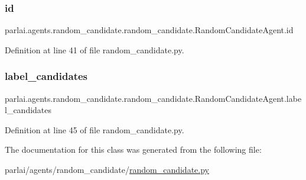 \subsubsection{\texorpdfstring{id}{id}}
{\footnotesize\ttfamily parlai.\+agents.\+random\+\_\+candidate.\+random\+\_\+candidate.\+Random\+Candidate\+Agent.\+id}



Definition at line 41 of file random\+\_\+candidate.\+py.

\mbox{\label{classparlai_1_1agents_1_1random__candidate_1_1random__candidate_1_1RandomCandidateAgent_abd4570210c517ac8da9f269f8302f228}} 
\subsubsection{\texorpdfstring{label\+\_\+candidates}{label\_candidates}}
{\footnotesize\ttfamily parlai.\+agents.\+random\+\_\+candidate.\+random\+\_\+candidate.\+Random\+Candidate\+Agent.\+label\+\_\+candidates}



Definition at line 45 of file random\+\_\+candidate.\+py.



The documentation for this class was generated from the following file\+:\begin{DoxyCompactItemize}
\item 
parlai/agents/random\+\_\+candidate/\hyperlink{random__candidate_8py}{random\+\_\+candidate.\+py}\end{DoxyCompactItemize}
